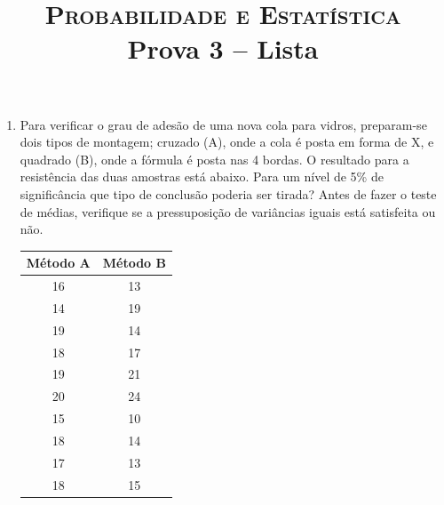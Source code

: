 \documentclass[12pt, a4paper]{article}
\begin{document}
\title{{\large \textsc{Probabilidade e Estatística}} \\[4pt] {\Huge Prova 3 – Lista}}
\author{}
\date{}
\maketitle

\begin{enumerate}

\item Para verificar o grau de adesão de uma nova cola para vidros, preparam-se dois tipos de montagem; cruzado (A), onde a cola é posta em forma de X, e quadrado (B), onde a fórmula é posta nas 4 bordas. O resultado para a resistência das duas amostras está abaixo. Para um nível de 5\% de significância que tipo de conclusão poderia ser tirada? Antes de fazer o teste de médias, verifique se a pressuposição de variâncias iguais está satisfeita ou não.

\begin{center}
\begin{tabular}{|c|c|}
\hline
\textbf{Método A} & \textbf{Método B} \\
\hline
16 & 13 \\
14 & 19 \\
19 & 14 \\
18 & 17 \\
19 & 21 \\
20 & 24 \\
15 & 10 \\
18 & 14 \\
17 & 13 \\
18 & 15 \\
\hline
\end{tabular}
\end{center}


\end{enumerate}
\end{document}
